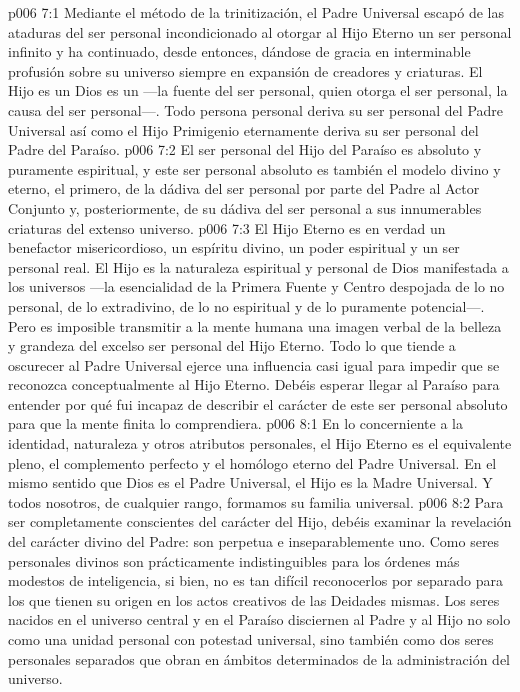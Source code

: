\vs p006 7:1 Mediante el método de la trinitización, el Padre Universal escapó de las ataduras del ser personal incondicionado al otorgar al Hijo Eterno un ser personal infinito y ha continuado, desde entonces, dándose de gracia en interminable profusión sobre su universo siempre en expansión de creadores y criaturas. El Hijo es un  Dios es un  ---la fuente del ser personal, quien otorga el ser personal, la causa del ser personal---. Todo persona personal deriva su ser personal del Padre Universal así como el Hijo Primigenio eternamente deriva su ser personal del Padre del Paraíso.
\vs p006 7:2 El ser personal del Hijo del Paraíso es absoluto y puramente espiritual, y este ser personal absoluto es también el modelo divino y eterno, el primero, de la dádiva del ser personal por parte del Padre al Actor Conjunto y, posteriormente, de su dádiva del ser personal a sus innumerables criaturas del extenso universo.
\vs p006 7:3 El Hijo Eterno es en verdad un benefactor misericordioso, un espíritu divino, un poder espiritual y un ser personal real. El Hijo es la naturaleza espiritual y personal de Dios manifestada a los universos ---la esencialidad de la Primera Fuente y Centro despojada de lo no personal, de lo extradivino, de lo no espiritual y de lo puramente potencial---. Pero es imposible transmitir a la mente humana una imagen verbal de la belleza y grandeza del excelso ser personal del Hijo Eterno. Todo lo que tiende a oscurecer al Padre Universal ejerce una influencia casi igual para impedir que se reconozca conceptualmente al Hijo Eterno. Debéis esperar llegar al Paraíso para entender por qué fui incapaz de describir el carácter de este ser personal absoluto para que la mente finita lo comprendiera.
\vs p006 8:1 En lo concerniente a la identidad, naturaleza y otros atributos personales, el Hijo Eterno es el equivalente pleno, el complemento perfecto y el homólogo eterno del Padre Universal. En el mismo sentido que Dios es el Padre Universal, el Hijo es la Madre Universal. Y todos nosotros, de cualquier rango, formamos su familia universal.
\vs p006 8:2 Para ser completamente conscientes del carácter del Hijo, debéis examinar la revelación del carácter divino del Padre: son perpetua e inseparablemente uno. Como seres personales divinos son prácticamente indistinguibles para los órdenes más modestos de inteligencia, si bien, no es tan difícil reconocerlos por separado para los que tienen su origen en los actos creativos de las Deidades mismas. Los seres nacidos en el universo central y en el Paraíso disciernen al Padre y al Hijo no solo como una unidad personal con potestad universal, sino también como dos seres personales separados que obran en ámbitos determinados de la administración del universo.

